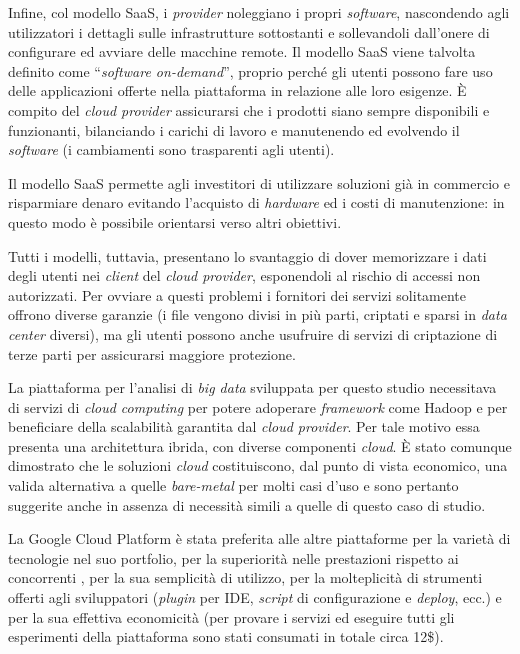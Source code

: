 Infine, col modello SaaS, i \textit{provider} noleggiano i propri \textit{software}, nascondendo agli utilizzatori i dettagli sulle infrastrutture sottostanti e sollevandoli dall’onere di configurare 
ed avviare delle macchine remote. Il modello SaaS viene talvolta definito come “\textit{software on-demand}”, proprio perché gli utenti possono fare uso delle applicazioni offerte nella 
piattaforma in relazione alle loro esigenze. È compito del \textit{cloud provider} assicurarsi che i prodotti siano sempre disponibili e funzionanti, bilanciando i carichi di lavoro e 
manutenendo ed evolvendo il \textit{software} (i cambiamenti sono trasparenti agli utenti).

Il modello SaaS permette agli investitori di utilizzare soluzioni già in commercio e risparmiare denaro evitando l’acquisto di \textit{hardware} ed i costi di manutenzione: in questo 
modo è possibile orientarsi verso altri obiettivi.

Tutti i modelli, tuttavia, presentano lo svantaggio di dover memorizzare i dati degli utenti nei \textit{client} del \textit{cloud provider}, esponendoli al rischio di accessi non autorizzati. 
Per ovviare a questi problemi i fornitori dei servizi solitamente offrono diverse garanzie (i file vengono divisi in più parti, criptati e sparsi in \textit{data center} diversi), ma 
gli utenti possono anche usufruire di servizi di criptazione di terze parti per assicurarsi maggiore protezione.

La piattaforma per l’analisi di \textit{big data} sviluppata per questo studio necessitava di servizi di \textit{cloud computing} per potere adoperare \textit{framework} come Hadoop e per beneficiare 
della scalabilità garantita dal \textit{cloud provider}. Per tale motivo essa presenta una architettura ibrida, con diverse componenti \textit{cloud}. È stato comunque 
dimostrato \cite{accenture:cloud} che le soluzioni \textit{cloud} costituiscono, dal punto di vista economico, 
una valida alternativa a quelle \textit{bare-metal} per molti casi d’uso e sono pertanto suggerite anche in assenza di necessità simili a quelle di questo caso di studio.

La Google Cloud Platform è stata preferita alle altre piattaforme per la varietà di tecnologie nel suo portfolio, per la superiorità nelle prestazioni rispetto ai 
concorrenti \cite{URL:gcpbest1} \cite{URL:gcpbest2}, per la sua semplicità di utilizzo, per la molteplicità di strumenti offerti agli sviluppatori 
(\textit{plugin} per IDE, \textit{script} di configurazione e \textit{deploy}, ecc.) e per la sua effettiva economicità (per provare i servizi ed eseguire tutti gli esperimenti della piattaforma 
sono stati consumati in totale circa 12\$).


